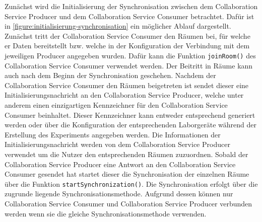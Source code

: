 Zunächst wird die Initialisierung der Synchronisation zwischen dem Collaboration Service Producer und dem Collaboration Service Consumer betrachtet. Dafür ist in \autoref{figure:initialisierung-synchronisation} ein möglicher Ablauf dargestellt. Zunächst tritt der Collaboration Service Consumer den Räumen bei, für welche er Daten bereitstellt bzw. welche in der Konfiguration der Verbindung mit dem jeweiligen Producer angegeben wurden. Dafür kann die Funktion \texttt{joinRoom()} des Collaboration Service Consumer verwendet werden. Der Beitritt in Räume kann auch nach dem Beginn der Synchronisation geschehen. Nachdem der Collaboration Service Consumer den Räumen beigetreten ist sendet dieser eine Initialisierungsnachricht an den Collaboration Service Producer, welche unter anderem einen einzigartigen Kennzeichner für den Collaboration Service Consumer beinhaltet. Dieser Kennzeichner kann entweder entsprechend generiert werden oder über die Konfiguration der entsprechenden Laborgeräte während der Erstellung des Experiments angegeben werden. Die Informationen der Initialisierungsnachricht werden von dem Collaboration Service Producer verwendet um die Nutzer den entsprechenden Räumen zuzuordnen. Sobald der Collaboration Service Producer eine Antwort an den Collaboration Service Consumer gesendet hat startet dieser die Synchronisation der einzelnen Räume über die Funktion \texttt{startSynchronization()}. Die Synchronisation erfolgt über die zugrunde liegende Synchronisationsmethode. Aufgrund dessen können nur Collaboration Service Consumer und Collaboration Service Producer verbunden werden wenn sie die gleiche Synchronisationsmethode verwenden.

